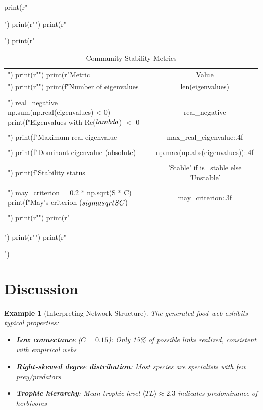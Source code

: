 \documentclass[a4paper, 11pt]{article}
\newtheorem{example}{Example}[section]
\begin{document}
\begin{pycode}
print(r"\begin{table}[htbp]")
print(r"\centering")
print(r"\caption{Community Stability Metrics}")
print(r"\begin{tabular}{lc}")
print(r"\toprule")
print(r"Metric & Value \\")
print(r"\midrule")
print(f"Number of eigenvalues & {len(eigenvalues)} \\\\")
real_negative = np.sum(np.real(eigenvalues) < 0)
print(f"Eigenvalues with Re($\\lambda$) $<$ 0 & {real_negative} \\\\")
print(f"Maximum real eigenvalue & {max_real_eigenvalue:.4f} \\\\")
print(f"Dominant eigenvalue (absolute) & {np.max(np.abs(eigenvalues)):.4f} \\\\")
print(f"Stability status & {'Stable' if is_stable else 'Unstable'} \\\\")
may_criterion = 0.2 * np.sqrt(S * C)
print(f"May's criterion ($\\sigma\\sqrt{{SC}}$) & {may_criterion:.3f} \\\\")
print(r"\bottomrule")
print(r"\end{tabular}")
print(r"\label{tab:stability}")
print(r"\end{table}")
\end{pycode}

\section{Discussion}

\begin{example}[Interpreting Network Structure]
The generated food web exhibits typical properties:
\begin{itemize}
\item \textbf{Low connectance} ($C = 0.15$): Only 15\% of possible links realized, consistent with empirical webs
\item \textbf{Right-skewed degree distribution}: Most species are specialists with few prey/predators
\item \textbf{Trophic hierarchy}: Mean trophic level $\langle TL \rangle \approx 2.3$ indicates predominance of herbivores
\end{itemize}
\end{example}
\end{document}
